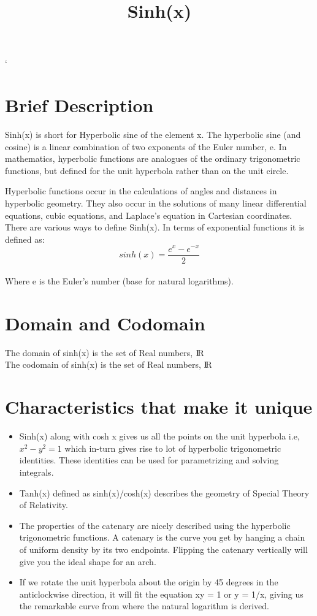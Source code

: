 \documentclass{article}
\title{Sinh(x)}
\date{}
\begin{document}
\maketitle`
\section{Brief Description}
    Sinh(x) is short for Hyperbolic sine of the element x. The hyperbolic sine (and cosine) is a linear combination of two exponents of the Euler number, e. In mathematics, hyperbolic functions are analogues of the ordinary trigonometric functions, but defined for the unit hyperbola rather than on the unit circle.\par
    Hyperbolic functions occur in the calculations of angles and distances in hyperbolic geometry. They also occur in the solutions of many linear differential equations, cubic equations, and Laplace's equation in Cartesian coordinates.
    There are various ways to define Sinh(x). In terms of exponential functions it is defined as:
    \\
    \begin{displaymath}
       sinh(x) = \frac{e^{x} - e^{-x}}{2} 
    \end{displaymath}
    \\
    Where e is the Euler’s number (base for natural logarithms).
\section{Domain and Codomain}
The domain of sinh(x) is the set of Real numbers, ${\rm I\!R}$\\
The codomain of sinh(x) is the set of Real numbers, ${\rm I\!R}$
\section{Characteristics that make it unique}
\begin{itemize}
    \item Sinh(x) along with cosh x gives us all the points on the unit hyperbola i.e, $x^{2} - y^{2} = 1$ which in-turn gives rise to lot of hyperbolic trigonometric identities. These identities can be used for parametrizing and solving integrals.
    \item Tanh(x) defined as sinh(x)/cosh(x) describes the geometry of Special Theory of Relativity.
    \item The properties of the catenary are nicely described using the hyperbolic trigonometric functions. A catenary is the curve you get by hanging a chain of uniform density by its two endpoints. Flipping the catenary vertically will give you the ideal shape for an arch.
    \item If we rotate the unit hyperbola about the origin by 45 degrees in the anticlockwise direction, it will fit the equation xy = 1 or y = 1/x, giving us the remarkable curve from where the natural logarithm is derived.
\end{itemize}
\end{document}
